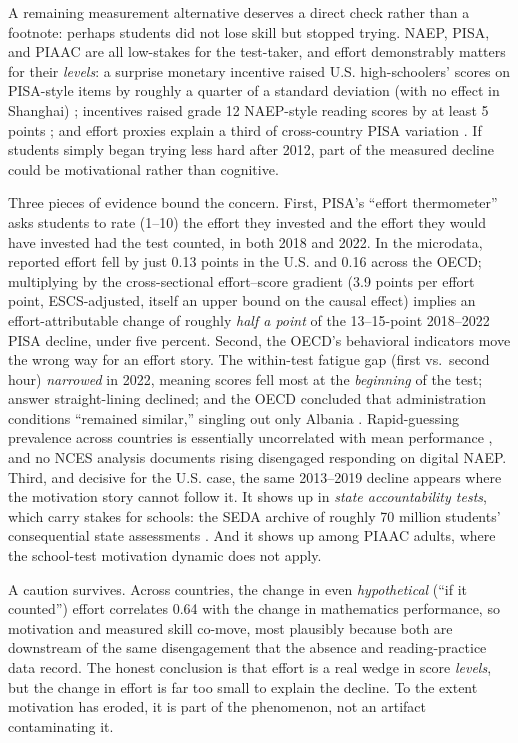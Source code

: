 \documentclass[11pt]{article}
\begin{document}
A remaining measurement alternative deserves a direct check rather than a footnote: perhaps students did not lose skill but stopped trying. NAEP, PISA, and PIAAC are all low-stakes for the test-taker, and effort demonstrably matters for their \emph{levels}: a surprise monetary incentive raised U.S. high-schoolers' scores on PISA-style items by roughly a quarter of a standard deviation (with no effect in Shanghai) \citep{gneezy2019}; incentives raised grade 12 NAEP-style reading scores by at least 5 points \citep{braun2011}; and effort proxies explain a third of cross-country PISA variation \citep{zamarro2019}. If students simply began trying less hard after 2012, part of the measured decline could be motivational rather than cognitive.

Three pieces of evidence bound the concern. First, PISA's ``effort thermometer'' asks students to rate (1--10) the effort they invested and the effort they would have invested had the test counted, in both 2018 and 2022. In the microdata, reported effort fell by just 0.13 points in the U.S. and 0.16 across the OECD; multiplying by the cross-sectional effort--score gradient (3.9 points per effort point, ESCS-adjusted, itself an upper bound on the causal effect) implies an effort-attributable change of roughly \emph{half a point} of the 13--15-point 2018--2022 PISA decline, under five percent. Second, the OECD's behavioral indicators move the wrong way for an effort story. The within-test fatigue gap (first vs.\ second hour) \emph{narrowed} in 2022, meaning scores fell most at the \emph{beginning} of the test; answer straight-lining declined; and the OECD concluded that administration conditions ``remained similar,'' singling out only Albania \citep{oecd2023}. Rapid-guessing prevalence across countries is essentially uncorrelated with mean performance \citep{avvisati2024}, and no NCES analysis documents rising disengaged responding on digital NAEP. Third, and decisive for the U.S. case, the same 2013--2019 decline appears where the motivation story cannot follow it. It shows up in \emph{state accountability tests}, which carry stakes for schools: the SEDA archive of roughly 70 million students' consequential state assessments \citep{dewey2026}. And it shows up among PIAAC adults, where the school-test motivation dynamic does not apply.

A caution survives. Across countries, the change in even \emph{hypothetical} (``if it counted'') effort correlates 0.64 with the change in mathematics performance, so motivation and measured skill co-move, most plausibly because both are downstream of the same disengagement that the absence and reading-practice data record. The honest conclusion is that effort is a real wedge in score \emph{levels}, but the change in effort is far too small to explain the decline. To the extent motivation has eroded, it is part of the phenomenon, not an artifact contaminating it.
\end{document}
